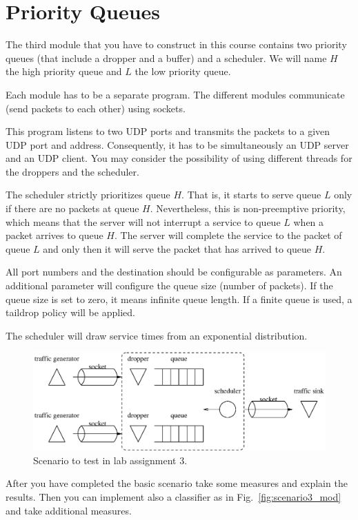 \section{Priority Queues}
The third module that you have to construct in this course contains two priority queues (that include a dropper and a buffer) and a scheduler.
We will name $H$ the high priority queue and $L$ the low priority queue.

Each module has to be a separate program. The different modules communicate (send packets to each other) using sockets.

This program listens to two UDP ports and transmits the packets to a given UDP port and address. Consequently, it has to be simultaneously an UDP server and an UDP client. You may consider the possibility of using different threads for the droppers and the scheduler.

The scheduler strictly prioritizes queue $H$.
That is, it starts to serve queue $L$ only if there are no packets at queue $H$.
Nevertheless, this is non-preemptive priority, which means that the server will not interrupt a service to queue $L$ when a packet arrives to queue $H$.
The server will complete the service to the packet of queue $L$ and only then it will serve the packet that has arrived to queue $H$.

All port numbers and the destination should be configurable as parameters. An additional parameter will configure the queue size (number of packets). If the queue size is set to zero, it means infinite queue length. If a finite queue is used, a taildrop policy will be applied.

The scheduler will draw service times from an exponential distribution.


\begin{figure}[!h]
\centering
\includegraphics[width=\linewidth]{figures/scenario3.eps}
\caption{Scenario to test in lab assignment 3.}
\label{fig:scenario3}
\end{figure}

After you have completed the basic scenario take some measures and explain the results.
Then you can implement also a classifier as in Fig.~\ref{fig:scenario3_mod} and take additional measures.


